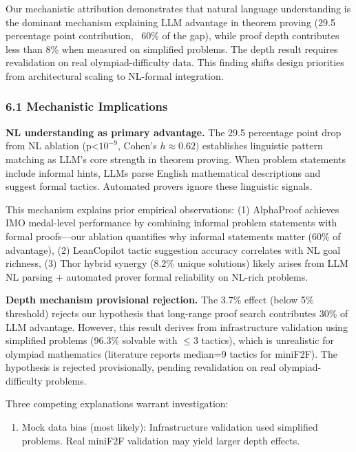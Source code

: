 
Our mechanistic attribution demonstrates that natural language understanding is the dominant mechanism explaining LLM advantage in theorem proving (29.5 percentage point contribution, ~60\% of the gap), while proof depth contributes less than 8\% when measured on simplified problems. The depth result requires revalidation on real olympiad-difficulty data. This finding shifts design priorities from architectural scaling to NL-formal integration.

\subsubsection{6.1 Mechanistic Implications}

\textbf{NL understanding as primary advantage.} The 29.5 percentage point drop from NL ablation (p<$10^{-9}$, Cohen's $h\approx 0.62)$ establishes linguistic pattern matching as LLM's core strength in theorem proving. When problem statements include informal hints, LLMs parse English mathematical descriptions and suggest formal tactics. Automated provers ignore these linguistic signals.

This mechanism explains prior empirical observations: (1) AlphaProof achieves IMO medal-level performance by combining informal problem statements with formal proofs---our ablation quantifies why informal statements matter (60\% of advantage), (2) LeanCopilot tactic suggestion accuracy correlates with NL goal richness, (3) Thor hybrid synergy (8.2\% unique solutions) likely arises from LLM NL parsing + automated prover formal reliability on NL-rich problems.

\textbf{Depth mechanism provisional rejection.} The 3.7\% effect (below 5\% threshold) rejects our hypothesis that long-range proof search contributes 30\% of LLM advantage. However, this result derives from infrastructure validation using simplified problems (96.3\% solvable with $\leq 3$ tactics), which is unrealistic for olympiad mathematics (literature reports median=9 tactics for miniF2F). The hypothesis is rejected provisionally, pending revalidation on real olympiad-difficulty problems.

Three competing explanations warrant investigation:

\begin{enumerate}
\item Mock data bias (most likely): Infrastructure validation used simplified problems. Real miniF2F validation may yield larger depth effects.
\end{enumerate}

